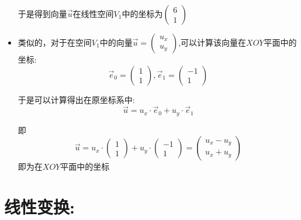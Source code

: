 \documentclass[UTF8]{article}
\begin{document}
\begin{itemize}
于是得到向量$\vec{u}$在线性空间$V_1$中的坐标为$
\left(
\begin{array}{l}
6 \\
1
\end{array}
\right)
$

	\item 
类似的，对于在空间$V_1$中的向量$\vec{u} = 
\left(
\begin{array}{l}
u_x \\ 
u_y
\end{array}
\right)
$,可以计算该向量在$XOY$平面中的坐标:
$$ \vec{e}_0 = 
\left(
\begin{array}{l}
1 \\ 
1
\end{array}
\right),
\vec{e}_1 = 
\left(
\begin{array}{l}
-1 \\ 
1
\end{array}
\right)$$

于是可以计算得出在原坐标系中:
$$\vec{u} = u_x\cdot \vec{e}_0 + u_y\cdot\vec{e}_1$$

即$$\vec{u} = u_x\cdot \left(
\begin{array}{l}
1 \\ 
1
\end{array}
\right) + u_y\cdot \left(
\begin{array}{l}
-1 \\ 
1
\end{array}
\right) = 
\left(
\begin{array}{l}
u_x - u_y \\ 
u_x + u_y
\end{array}
\right)$$
即为在$XOY$平面中的坐标

\end{itemize}

\section{线性变换:}
\end{document}
